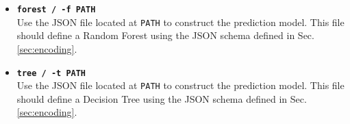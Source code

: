 \begin{itemize}[leftmargin=*]
	\item[] \textbf{\texttt{\textendash\textendash forest / -f PATH}} \\ Use the JSON file located at \texttt{PATH} to construct the prediction model. This file should define a Random Forest using the JSON schema defined in Sec. \ref{sec:encoding}.
	\item[] \textbf{\texttt{\textendash\textendash tree / -t PATH}} \\ Use the JSON file located at \texttt{PATH} to construct the prediction model. This file should define a Decision Tree using the JSON schema defined in Sec. \ref{sec:encoding}.
\end{itemize}

